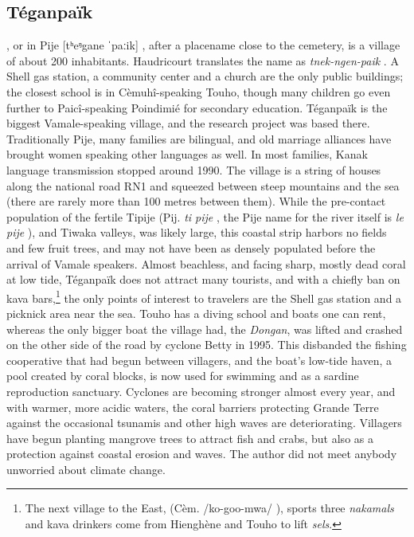 \subsection{Téganpaïk}
, or in Pije [tʰeᵑgane ˈpaːik] , after a placename close to the cemetery, is a village of about 200 inhabitants. Haudricourt translates the name as \textit{tnek-ngen-paik}  \parencite[229]{haudricourt_langue_1968}.%
A Shell gas station, a community center and a church are the only public buildings; the closest school is in Cèmuhî-speaking Touho, though many children go even further to Paicî-speaking Poindimié for secondary education. Téganpaïk is the biggest Vamale-speaking village, and the research project was based there. Traditionally Pije, many families are bilingual, and old marriage alliances have brought women speaking other languages as well. In most families, Kanak language transmission stopped around 1990. %
The village is a string of houses along the national road RN1 and squeezed between steep mountains and the sea (there are rarely more than 100 metres between them). While the pre-contact population of the fertile Tipije (Pij. \textit{ti pije} , the Pije name for the river itself is \textit{le pije} ), and Tiwaka valleys, was likely large, this coastal strip harbors no fields and few fruit trees, and may not have been as densely populated before the arrival of Vamale speakers. Almost beachless, and facing sharp, mostly dead coral at low tide, Téganpaïk does not attract many tourists, and with a chiefly ban on kava bars,\footnote{The next village to the East,  (Cèm. /ko-goo-mwa/ ), sports three \textit{nakamals} and kava drinkers come from Hienghène and Touho to lift \textit{sels}.} the only points of interest to travelers are the Shell gas station and a picknick area near the sea. Touho has a diving school and boats one can rent, whereas the only bigger boat the village had, the \textit{Dongan}, was lifted and crashed on the other side of the road by cyclone Betty in 1995. This disbanded the fishing cooperative that had begun between villagers, and the boat's low-tide haven, a pool created by coral blocks, is now used for swimming and as a sardine reproduction sanctuary. Cyclones are becoming stronger almost every year, and with warmer, more acidic waters, the coral barriers protecting Grande Terre against the occasional tsunamis and other high waves are deteriorating. Villagers have begun planting mangrove trees to attract fish and crabs, but also as a protection against coastal erosion and waves. The author did not meet anybody unworried about climate change.

